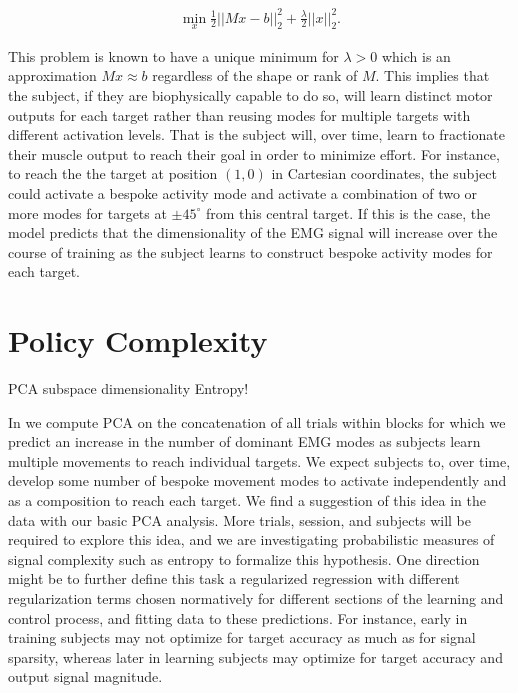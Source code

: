 \documentclass[../main.tex]{subfiles}
\begin{document}
\begin{align}
  \min_x\frac{1}{2}||Mx - b||^2_2 + \frac{\lambda}{2}||x||_2^2.
\end{align}

This problem is known to have a unique minimum for $\lambda>0$ which is an approximation $Mx\approx b$ regardless of the shape or rank of $M$. This implies that the subject, if they are biophysically capable to do so, will learn distinct motor outputs for each target rather than reusing modes for multiple targets with different activation levels. That is the subject will, over time, learn to fractionate their muscle output to reach their goal in order to minimize effort. For instance, to reach the the target at position $(1,0)$ in Cartesian coordinates, the subject could activate a bespoke activity mode and activate a combination of two or more modes for targets at $\pm45^\circ$ from this central target. If this is the case, the model predicts that the dimensionality of the EMG signal will increase over the course of training as the subject learns to construct bespoke activity modes for each target.



\section{Policy Complexity}

PCA subspace dimensionality
Entropy!


In  we compute PCA on the concatenation of all trials within blocks for which we predict an increase in the number of dominant EMG modes as subjects learn multiple movements to reach individual targets. We expect subjects to, over time, develop some number of bespoke movement modes to activate independently and as a composition to reach each target. We find a suggestion of this idea in the data with our basic PCA analysis. More trials, session, and subjects will be required to explore this idea, and we are investigating probabilistic measures of signal complexity such as entropy to formalize this hypothesis. One direction might be to further define this task a regularized regression with different regularization terms chosen normatively for different sections of the learning and control process, and fitting data to these predictions. For instance, early in training subjects may not optimize for target accuracy as much as for signal sparsity, whereas later in learning subjects may optimize for target accuracy and output signal magnitude.
\end{document}
